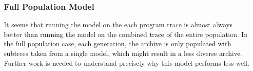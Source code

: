 

\subsubsection{Full Population Model}
It seems that running the model on the each program trace is almost always better than running the model on the combined trace of the entire population.  In the full population case, each generation, the archive is only populated with subtrees taken from a single model, which might result in a less diverse archive.  Further work is needed to understand precisely why this model performs less well.


